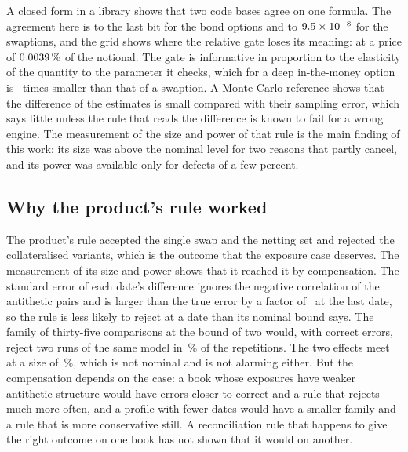 A closed form in a library shows that two code bases agree on one formula. The agreement here is to the last bit for the bond options and to $9.5\times10^{-8}$ for the swaptions, and the grid shows where the relative gate loses its meaning: at a price of $0.0039\,\%$ of the notional. The gate is informative in proportion to the elasticity of the quantity to the parameter it checks, which for a deep in-the-money option is \nElasticityRatio\ times smaller than that of a swaption. A Monte Carlo reference shows that the difference of the estimates is small compared with their sampling error, which says little unless the rule that reads the difference is known to fail for a wrong engine. The measurement of the size and power of that rule is the main finding of this work: its size was above the nominal level for two reasons that partly cancel, and its power was available only for defects of a few percent.

\subsection{Why the product's rule worked}
\label{sec:discussion-accident}

The product's rule accepted the single swap and the netting set and rejected the collateralised variants, which is the outcome that the exposure case deserves. The measurement of its size and power shows that it reached it by compensation. The standard error of each date's difference ignores the negative correlation of the antithetic pairs and is larger than the true error by a factor of \nOverstateLast\ at the last date, so the rule is less likely to reject at a date than its nominal bound says. The family of thirty-five comparisons at the bound of two would, with correct errors, reject two runs of the same model in \nSizePairNetting\,\% of the repetitions. The two effects meet at a size of \nSizeProdNetting\,\%, which is not nominal and is not alarming either. But the compensation depends on the case: a book whose exposures have weaker antithetic structure would have errors closer to correct and a rule that rejects much more often, and a profile with fewer dates would have a smaller family and a rule that is more conservative still. A reconciliation rule that happens to give the right outcome on one book has not shown that it would on another.

